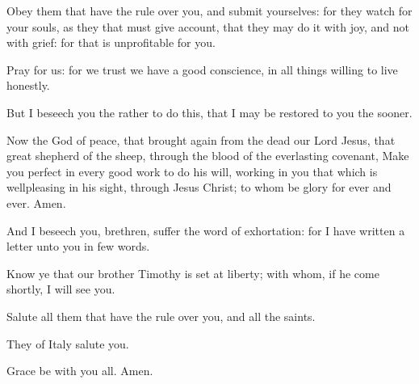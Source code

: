 \Verse Obey them that have the rule over you, and submit yourselves: for they watch for your souls, as they that must give account, that they may do it with joy, and not with grief: for that is unprofitable for you.

\Verse Pray for us: for we trust we have a good conscience, in all things willing to live honestly.

\Verse But I beseech you the rather to do this, that I may be restored to you the sooner.

\Verse Now the God of peace, that brought again from the dead our Lord Jesus, that great shepherd of the sheep, through the blood of the everlasting covenant, \Verse Make you perfect in every good work to do his will, working in you that which is wellpleasing in his sight, through Jesus Christ; to whom be glory for ever and ever. Amen.

\Verse And I beseech you, brethren, suffer the word of exhortation: for I have written a letter unto you in few words.

\Verse Know ye that our brother Timothy is set at liberty; with whom, if he come shortly, I will see you.

\Verse Salute all them that have the rule over you, and all the saints.

They of Italy salute you.

\Verse Grace be with you all. Amen.

